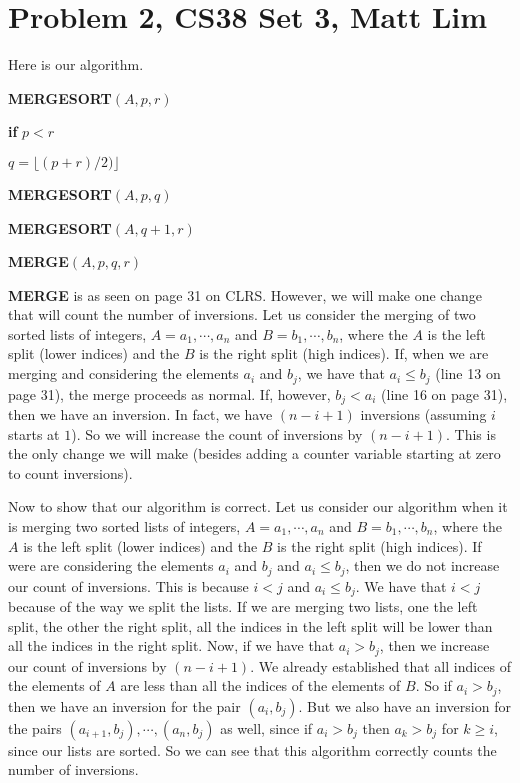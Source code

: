 \documentclass{article}
\begin{document}
\section*{Problem 2, CS38 Set 3, Matt Lim}
Here is our algorithm.

\vspace{5mm}
\noindent \textbf{MERGESORT}$(A,p,r)$
\begin{enumerate}
    \item \textbf{if} $p < r$
    {\setlength\itemindent{25pt} \item $q = \lfloor(p+r)/2)\rfloor$ }
    {\setlength\itemindent{25pt} \item \textbf{MERGESORT}$(A,p,q)$ }
    {\setlength\itemindent{25pt} \item \textbf{MERGESORT}$(A,q+1,r)$ }
    {\setlength\itemindent{25pt} \item \textbf{MERGE}$(A,p,q,r)$ }
\end{enumerate}

\textbf{MERGE} is as seen on page 31 on CLRS. However, we will make one change
that will count the number of inversions. Let us consider the merging of two
sorted lists of integers, $A = a_1, \cdots, a_n$ and $
B = b_1, \cdots, b_n$, where
the $A$ is the left split (lower indices) and the $B$ is the
right split (high indices). If, when
we are merging and considering the elements $a_i$ and $b_j$,
we have that $a_i \leq b_j$ (line 13 on page 31), the merge proceeds as normal. If,
however, $b_j < a_i$ (line 16 on page 31), then we have an inversion. In fact,
we have $(n - i + 1)$ inversions (assuming $i$ starts at $1$). So we will increase the count
of inversions by $(n - i + 1)$. This is the only change we will make (besides adding
a counter variable starting at zero to count inversions).

Now to show that our algorithm is correct. Let us consider our algorithm when it
is merging two sorted lists of integers, $A = a_1, \cdots, a_n$ and $B = b_1, \cdots,
b_n$, where
the $A$ is the left split (lower indices) and the $B$ is the
right split (high indices). If were are considering the elements $a_i$ and $b_j$
and $a_i \leq b_j$, then
we do not increase our count of inversions. This is because $i < j$ and $a_i
\leq
b_j$. We have that $i < j$ because of the way we split the lists. If we are
merging two lists, one the left split, the other the right split, all the
indices in the left split will be lower than all the indices in the right split.
Now, if we have that $a_i > b_j$, then we increase our count of inversions by
$(n-i + 1)$. We already established that all indices of the elements of $A$ are less
than all the indices of the elements of $B$. So if $a_i > b_j$, then we have an
inversion for the pair $(a_i, b_j)$. But we also have an inversion for the pairs
$(a_{i+1}, b_j), \cdots, (a_n, b_j)$ as well, since if $a_i > b_j$ then $a_k >
b_j$ for $k \ge i$, since our lists are sorted. So we can see that this
algorithm correctly counts the number of inversions.
\end{document}
